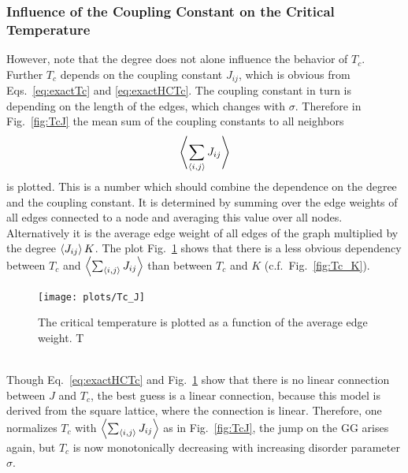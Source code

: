     \subsubsection{Influence of the Coupling Constant on the Critical Temperature}%
    \label{sssec:J}
        However, note that the degree does not alone influence the behavior of \(T_c\).
        Further \(T_c\) depends on the coupling constant \(J_{ij}\), which is
        obvious from Eqs.\ \eqref{eq:exactTc} and \eqref{eq:exactHCTc}. The
        coupling constant in turn is depending on the length of the edges,
        which changes with \(\sigma\).
        Therefore  in Fig.\ \ref{fig:TcJ}
        the mean sum of the coupling constants to all neighbors
        \begin{equation}
            \left< \sum_{\left< i,j \right>} J_{ij} \right>
        \end{equation}
        is plotted. This is a number which should combine the dependence on
        the degree and the coupling constant. It is determined by summing
        over the edge weights of all edges connected to a node and averaging
        this value over all nodes. Alternatively it is the average edge weight
        of all edges of the graph multiplied by the degree \(\left< J_{ij} \right> K\).
        The plot Fig.\ \ref{fig:Tc_J} shows that
        there is a less obvious dependency between \(T_c\) and \(\left< \sum_{\left< i,j \right>} J_{ij} \right>\)
        than between \(T_c\) and \(K\) (c.f.\ Fig.\ \ref{fig:Tc_K}).
        \begin{figure}[htbp]
            \centering
            \texttt{[image: plots/Tc\_J]}
            \caption[Critical Temperature as a Function of the Degree of the Graph]
            {
                The critical temperature is plotted as a function of the
                average edge weight. T
            }
            \label{fig:Tc_J}
        \end{figure}\\
        Though Eq.\ \eqref{eq:exactHCTc} and Fig.\ \ref{fig:Tc_J} show
        that there is no linear connection between \(J\) and \(T_c\), the best guess
        is a linear connection, because this model is derived from the
        square lattice, where the connection is linear. Therefore, one
        normalizes \(T_c\) with \(\left< \sum_{\left< i,j \right>} J_{ij} \right>\) as in
        Fig.\ \ref{fig:TcJ}, the
        jump on the GG arises again, but \(T_c\) is now monotonically
        decreasing with increasing disorder parameter \(\sigma\).

